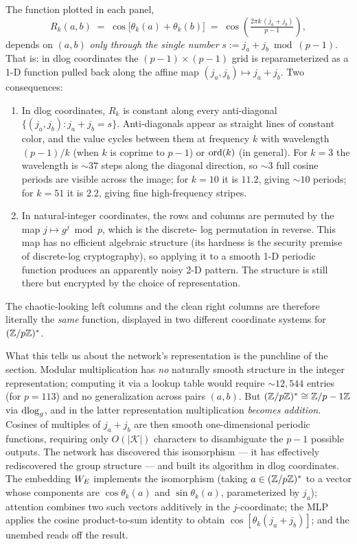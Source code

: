 The function plotted in each panel,
\begin{equation}
  R_k(a, b)
  \;=\; \cos\!\big[\theta_k(a) + \theta_k(b)\big]
  \;=\; \cos\!\left(\tfrac{2\pi k\,(j_a + j_b)}{p-1}\right),
\end{equation}
depends on $(a, b)$ \emph{only through the single number}
$s := j_a + j_b \bmod (p-1)$.  That is: in dlog coordinates the
$(p-1) \times (p-1)$ grid is reparameterized as a 1-D function pulled
back along the affine map $(j_a, j_b) \mapsto j_a + j_b$.  Two
consequences:

\begin{enumerate}
\item In dlog coordinates, $R_k$ is constant along every anti-diagonal
  $\{(j_a, j_b) : j_a + j_b = s\}$.  Anti-diagonals appear as straight
  lines of constant color, and the value cycles between them at
  frequency $k$ with wavelength $(p-1)/k$ (when $k$ is coprime to
  $p-1$) or $\operatorname{ord}(k)$ (in general).  For $k = 3$ the wavelength is
  $\sim 37$ steps along the diagonal direction, so $\sim 3$ full
  cosine periods are visible across the image; for $k = 10$ it is
  $11.2$, giving $\sim 10$ periods; for $k = 51$ it is $2.2$, giving
  fine high-frequency stripes.

\item In natural-integer coordinates, the rows and columns are
  permuted by the map $j \mapsto g^j \bmod p$, which is the discrete-
  log permutation in reverse.  This map has no efficient algebraic
  structure (its hardness is the security premise of discrete-log
  cryptography), so applying it to a smooth 1-D periodic function
  produces an apparently noisy 2-D pattern.  The structure is still
  there but encrypted by the choice of representation.
\end{enumerate}

The chaotic-looking left columns and the clean right columns are
therefore literally the \emph{same} function, displayed in two
different coordinate systems for $(\mathbb{Z}/p\mathbb{Z})^*$.

What this tells us about the network's representation is the punchline
of the section.  Modular multiplication has \emph{no} naturally smooth
structure in the integer representation; computing it via a lookup
table would require $\sim 12{,}544$ entries (for $p = 113$) and no
generalization across pairs $(a, b)$.  But $(\mathbb{Z}/p\mathbb{Z})^* \cong \mathbb{Z}/p-1\mathbb{Z}$
via $\operatorname{dlog}_g$, and in the latter representation multiplication
\emph{becomes addition}.  Cosines of multiples of $j_a + j_b$ are then
smooth one-dimensional periodic functions, requiring only
$O(|\mathcal{K}|)$ characters to disambiguate the $p-1$ possible
outputs.  The network has discovered this isomorphism --- it has
effectively rediscovered the group structure --- and built its
algorithm in dlog coordinates.  The embedding $W_E$ implements the
isomorphism (taking $a \in (\mathbb{Z}/p\mathbb{Z})^*$ to a vector whose components are
$\cos\theta_k(a)$ and $\sin\theta_k(a)$, parameterized by $j_a$);
attention combines two such vectors additively in the $j$-coordinate;
the MLP applies the cosine product-to-sum identity to obtain
$\cos[\theta_k(j_a + j_b)]$; and the unembed reads off the result.

